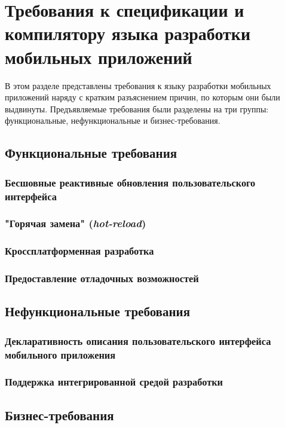 \section{Требования к спецификации и компилятору языка разработки мобильных приложений}
\label{requirements-section}
В этом разделе представлены требования к языку разработки мобильных приложений
наряду с кратким разъяснением причин, по которым они были выдвинуты.
Предъявляемые требования были разделены на три группы: функциональные,
нефункциональные и бизнес-требования.


\subsection{Функциональные требования}
\subsubsection*{Бесшовные реактивные обновления пользовательского интерфейса}

\subsubsection*{"Горячая замена" (\textit{hot-reload})}

\subsubsection*{Кроссплатформенная разработка}

\subsubsection*{Предоставление отладочных возможностей}


\subsection{Нефункциональные требования}
\subsubsection*{Декларативность описания пользовательского интерфейса мобильного приложения}

\subsubsection*{Поддержка интегрированной средой разработки}


\subsection{Бизнес-требования}
